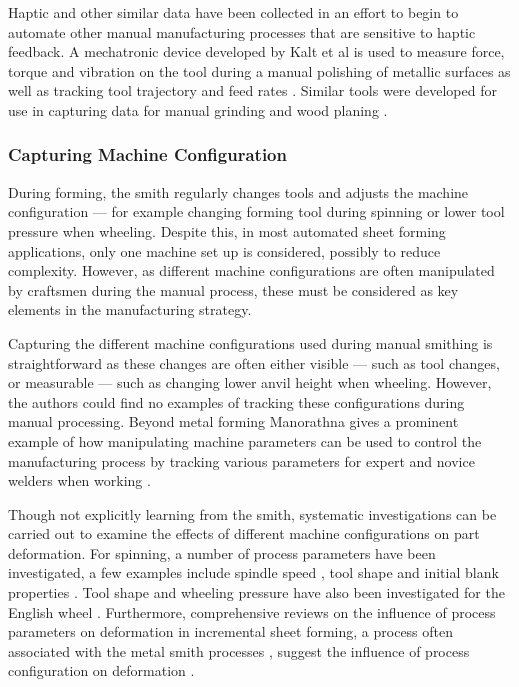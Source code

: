 Haptic and other similar data have been collected in an effort to begin to automate other manual manufacturing processes that are sensitive to haptic feedback. A mechatronic device developed by Kalt et al is used to measure force, torque and vibration on the tool during a manual polishing of metallic surfaces as well as tracking tool trajectory and feed rates \citep{Kalt2016TowardsOperation}. Similar tools were developed for use in capturing data for manual grinding \citep{Phan2018InstrumentationWorkpiece} and wood planing \citep{Montebelli2015OnTasks}.


\subsubsection{Capturing Machine Configuration} \label{sec:capturingmachineconfig}
During forming, the smith regularly changes tools and adjusts the machine configuration --- for example changing forming tool during spinning or lower tool pressure when wheeling. Despite this, in most automated sheet forming applications, only one machine set up is considered, possibly to reduce complexity. However, as different machine configurations are often manipulated by craftsmen during the manual process, these must be considered as key elements in the manufacturing strategy.

Capturing the different machine configurations used during  manual smithing is straightforward as these changes are often either visible --- such as tool changes, or measurable --- such as changing lower anvil height when wheeling. However, the authors could find no examples of tracking these configurations during manual processing. Beyond metal forming Manorathna gives a prominent example of how manipulating machine parameters can be used to control the manufacturing process by tracking various parameters for expert and novice welders when working \citep{Manorathna2017HumanAutomation}. 

Though not explicitly learning from the smith, systematic investigations can be carried out to examine the effects of different machine configurations on part deformation. For spinning, a number of process parameters have been investigated, a few examples include spindle speed \citep{Sugar2016AnalysisSteels,Essa2010OptimizationAnalysis}, tool shape \citep{El-Khabeery1991OnCups,Essa2010OptimizationAnalysis} and initial blank properties \citep{Watson2015InvestigationMethod}. Tool shape and wheeling pressure have also been investigated for the English wheel \citep{Bowen2021NumericalProcess}. Furthermore, comprehensive reviews on the influence of process parameters on deformation in incremental sheet forming, a process often associated with the metal smith processes \citep{Music2012TheTools}, suggest the influence of process configuration on deformation \citep{Gatea2016ReviewForming,Gohil2021ReviewProcess}.

